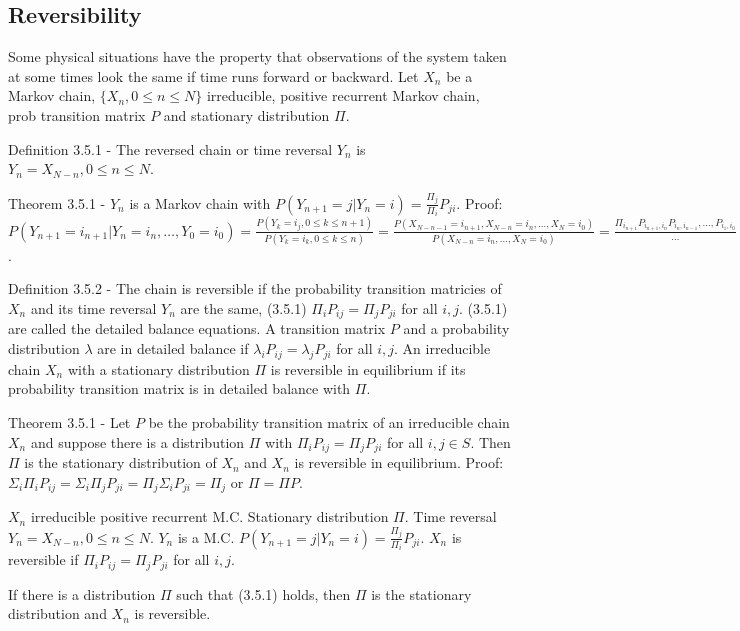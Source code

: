 \documentclass{article}
\begin{document}
\subsection{Reversibility}

Some physical situations have the property that observations of the system taken at some times look the same if time runs forward or backward. Let $X_n$ be a Markov chain, $\{X_n, 0 \le n \le N\}$ irreducible, positive recurrent Markov chain, prob transition matrix $P$ and stationary distribution $\Pi$.

Definition 3.5.1 - The reversed chain or time reversal $Y_n$ is $Y_n = X_{N-n}, 0 \le n \le N$.

Theorem 3.5.1 - $Y_n$ is a Markov chain with $P(Y_{n+1} = j | Y_n = i) = \frac{\Pi_j}{\Pi_i} P_{ji}$. Proof: $P(Y_{n+1} = i_{n+1} | Y_n = i_n, \dots, Y_0 = i_0) = \frac{P(Y_k = i_j, 0 \le k \le n + 1)}{P(Y_k = i_k, 0 \le k \le n)} = \frac{P(X_{N-n-1} = i_{n+1}, X_{N-n} = i_n, \dots, X_N = i_0)}{P(X_{N-n} = i_n, \dots, X_N = i_0)} = \frac{\Pi_{i_{n+1}} P_{i_{n+1}, i_n} P_{i_n, i_{n-1}}, \dots, P_{i_1, i_0}}{\dots} = \frac{\Pi_{i_{n+1}} P_{i{n+1}, i_n}}{\Pi_{i_n}}$.

Definition 3.5.2 - The chain is reversible if the probability transition matricies of $X_n$ and its time reversal $Y_n$ are the same, (3.5.1) $\Pi_i P_{ij} = \Pi_j P_{ji}$ for all $i, j$. (3.5.1) are called the detailed balance equations. A transition matrix $P$ and a probability distribution $\lambda$ are in detailed balance if $\lambda_i P_{ij} = \lambda_j P_{ji}$ for all $i, j$. An irreducible chain $X_n$ with a stationary distribution $\Pi$ is reversible in equilibrium if its probability transition matrix is in detailed balance with $\Pi$.

Theorem 3.5.1 - Let $P$ be the probability transition matrix of an irreducible chain $X_n$ and suppose there is a distribution $\Pi$ with $\Pi_i P_{ij} = \Pi_j P_{ji}$ for all $i, j \in S$. Then $\Pi$ is the stationary distribution of $X_n$ and $X_n$ is reversible in equilibrium. Proof: $\Sigma_i \Pi_i P_{ij} = \Sigma_i \Pi_j P_{ji} = \Pi_j \Sigma_i P_{ji} = \Pi_j$ or $\Pi = \Pi P$.

$X_n$ irreducible positive recurrent M.C. Stationary distribution $\Pi$. Time reversal $Y_n = X_{N-n}, 0 \le n \le N$. $Y_n$ is a M.C. $P(Y_{n+1} = j | Y_n = i) = \frac{\Pi_j}{\Pi_i} P_{ji}$. $X_n$ is reversible if $\Pi_i P_{ij} = \Pi_j P_{ji}$ for all $i, j$.

If there is a distribution $\Pi$ such that (3.5.1) holds, then $\Pi$ is the stationary distribution and $X_n$ is reversible.
\end{document}
